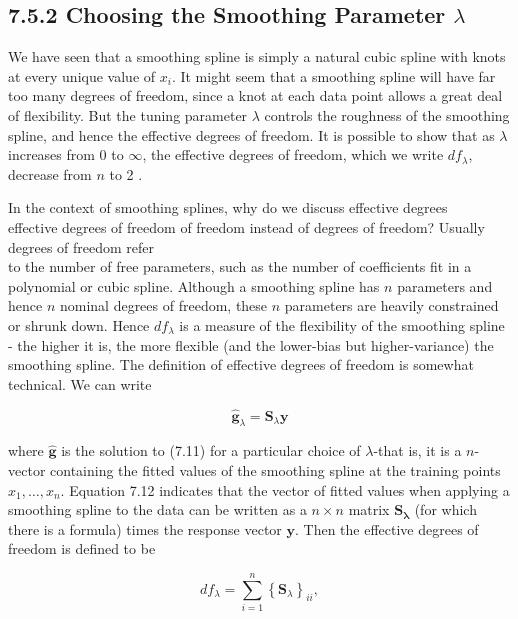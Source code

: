 \documentclass[10pt]{article}
\begin{document}
\subsection*{7.5.2 Choosing the Smoothing Parameter $\lambda$}
We have seen that a smoothing spline is simply a natural cubic spline with knots at every unique value of $x_{i}$. It might seem that a smoothing spline will have far too many degrees of freedom, since a knot at each data point allows a great deal of flexibility. But the tuning parameter $\lambda$ controls the roughness of the smoothing spline, and hence the effective degrees of freedom. It is possible to show that as $\lambda$ increases from 0 to $\infty$, the effective degrees of freedom, which we write $d f_{\lambda}$, decrease from $n$ to 2 .

In the context of smoothing splines, why do we discuss effective degrees\\
effective degrees of freedom of freedom instead of degrees of freedom? Usually degrees of freedom refer\\
to the number of free parameters, such as the number of coefficients fit in a polynomial or cubic spline. Although a smoothing spline has $n$ parameters and hence $n$ nominal degrees of freedom, these $n$ parameters are heavily constrained or shrunk down. Hence $d f_{\lambda}$ is a measure of the flexibility of the smoothing spline - the higher it is, the more flexible (and the lower-bias but higher-variance) the smoothing spline. The definition of effective degrees of freedom is somewhat technical. We can write


\begin{equation*}
\hat{\mathbf{g}}_{\lambda}=\mathbf{S}_{\lambda} \mathbf{y} \tag{7.12}
\end{equation*}


where $\hat{\mathbf{g}}$ is the solution to (7.11) for a particular choice of $\lambda$-that is, it is a $n$-vector containing the fitted values of the smoothing spline at the training points $x_{1}, \ldots, x_{n}$. Equation 7.12 indicates that the vector of fitted values when applying a smoothing spline to the data can be written as a $n \times n$ matrix $\mathbf{S}_{\boldsymbol{\lambda}}$ (for which there is a formula) times the response vector $\mathbf{y}$. Then the effective degrees of freedom is defined to be


\begin{equation*}
d f_{\lambda}=\sum_{i=1}^{n}\left\{\mathbf{S}_{\lambda}\right\}_{i i}, \tag{7.13}
\end{equation*}
\end{document}
